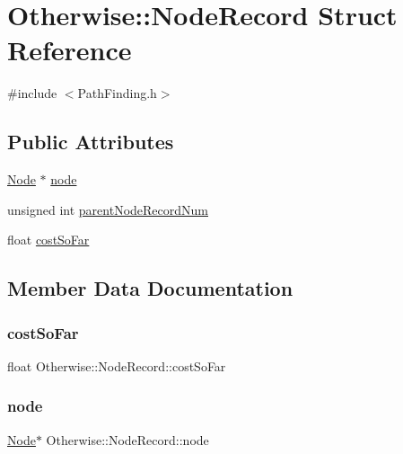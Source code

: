 \hypertarget{struct_otherwise_1_1_node_record}{}\section{Otherwise\+:\+:Node\+Record Struct Reference}
\label{struct_otherwise_1_1_node_record}


{\ttfamily \#include $<$Path\+Finding.\+h$>$}

\subsection*{Public Attributes}
\begin{DoxyCompactItemize}
\item 
\hyperlink{struct_otherwise_1_1_node}{Node} $\ast$ \hyperlink{struct_otherwise_1_1_node_record_af2a3f306238d27b20a44382aa9978340}{node}
\item 
unsigned int \hyperlink{struct_otherwise_1_1_node_record_aa44a35596eb628da85b1a3931e3ec3ba}{parent\+Node\+Record\+Num}
\item 
float \hyperlink{struct_otherwise_1_1_node_record_a1ee095597e84218e41727e3e3b9f017e}{cost\+So\+Far}
\end{DoxyCompactItemize}


\subsection{Member Data Documentation}
\mbox{\label{struct_otherwise_1_1_node_record_a1ee095597e84218e41727e3e3b9f017e}} 
\subsubsection{\texorpdfstring{cost\+So\+Far}{costSoFar}}
{\footnotesize\ttfamily float Otherwise\+::\+Node\+Record\+::cost\+So\+Far}

\mbox{\label{struct_otherwise_1_1_node_record_af2a3f306238d27b20a44382aa9978340}} 
\subsubsection{\texorpdfstring{node}{node}}
{\footnotesize\ttfamily \hyperlink{struct_otherwise_1_1_node}{Node}$\ast$ Otherwise\+::\+Node\+Record\+::node}

